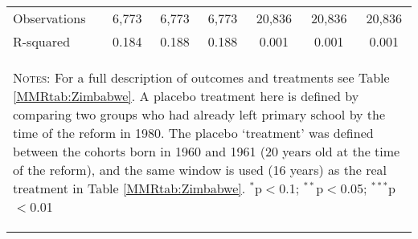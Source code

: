 \begin{landscape}
\begin{table}[htpb!]
\begin{center}
\begin{tabular}{lcccccc}
Observations&6,773&6,773&6,773&20,836&20,836&20,836\\
R-squared&0.184&0.188&0.188&0.001&0.001&0.001\\
\midrule
\multicolumn{7}{p{15.4cm}}{\begin{footnotesize}\textsc{Notes:} For a full description of outcomes and treatments see Table \ref{MMRtab:Zimbabwe}. A placebo treatment here is defined by comparing two groups who had already left primary school by the time of the reform in 1980.  The placebo `treatment' was defined between the cohorts born in 1960 and 1961 (20 years old at the time of the reform), and the same window is used (16 years) as the real treatment in Table \ref{MMRtab:Zimbabwe}.
$^{*}$p$<$0.1; $^{**}$p$<$0.05; $^{***}$p$<$0.01\end{footnotesize}} \\ \bottomrule 
\end{tabular}\end{center}\end{table}\end{landscape}